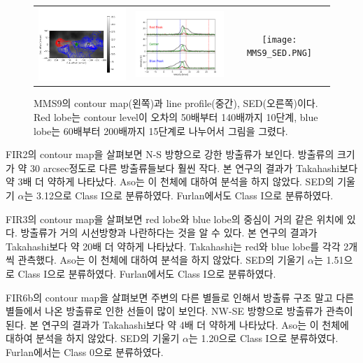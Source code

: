 \begin{figure}[h!]
	\begin{center}
		\begin{tabular}{ccc}
			\includegraphics[width=5cm]{Orion_12CO2-1_MMS9_rbcontour_400_modified.png} &   \includegraphics[width=5cm]{Orion_12CO2-1_MMS9_line_profile_400.png} &
			\texttt{[image: MMS9\_SED.PNG]}\\
		\end{tabular}
		\caption{MMS9의 contour map(왼쪽)과 line profile(중간), SED(오른쪽)이다. Red lobe는 contour level이 오차의 50배부터 140배까지 10단계, blue lobe는 60배부터 200배까지 15단계로 나누어서 그림을 그렸다.}
	\end{center}
\end{figure}

\clearpage
\newpage   
FIR2의 contour map을 살펴보면 N-S 방향으로 강한 방출류가 보인다. 방출류의 크기가 약 30 arcsec정도로 다른 방출류들보다 훨씬 작다. 본 연구의 결과가 Takahashi보다 약 3배 더 약하게 나타났다. Aso는 이 천체에 대하여 분석을 하지 않았다. SED의 기울기 $\alpha$는 3.12으로 Class I으로 분류하였다. Furlan에서도 Class I으로 분류하였다.\cite{HerschelFurlan} 

FIR3의 contour map을 살펴보면  red lobe와 blue lobe의 중심이 거의 같은 위치에 있다. 방출류가 거의 시선방향과 나란하다는 것을 알 수 있다. 본 연구의 결과가 Takahashi보다 약 20배 더 약하게 나타났다. Takahashi는 red와 blue lobe를 각각 2개씩 관측했다. Aso는 이 천체에 대하여 분석을 하지 않았다.  SED의 기울기 $\alpha$는 1.51으로 Class I으로 분류하였다. Furlan에서도 Class I으로 분류하였다.\cite{HerschelFurlan} 

FIR6b의 contour map을 살펴보면 주변의 다른 별들로 인해서 방출류 구조 말고 다른 별들에서 나온 방출류로 인한 선들이 많이 보인다. NW-SE 방향으로 방출류가 관측이 된다. 본 연구의 결과가 Takahashi보다 약 4배 더 약하게 나타났다. Aso는 이 천체에 대하여 분석을 하지 않았다. SED의 기울기 $\alpha$는 1.20으로 Class I으로 분류하였다. Furlan에서는 Class 0으로 분류하였다.\cite{HerschelFurlan} 

